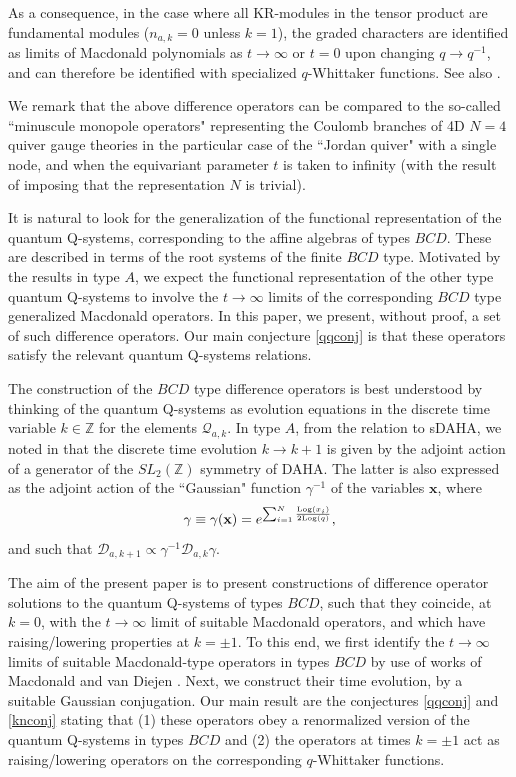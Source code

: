\documentclass[12pt]{amsart}
\newcommand{\Z}{{\mathbb Z}}
\newcommand{\Q}{{\mathcal Q}}
\newcommand{\bx}{{\mathbf x}}
\numberwithin{equation}{section}
\numberwithin{table}{section}
\begin{document}
As a consequence, in the case where all KR-modules in the tensor product are fundamental modules
($n_{a,k}=0$ unless $k=1$), the graded characters are identified as limits of Macdonald polynomials as $t\to\infty$ or $t=0$ upon changing $q\to q^{-1}$, and can therefore be identified with specialized $q$-Whittaker functions. See also \cite{LNSSS}.


We remark that the above difference operators can be compared to the so-called ``minuscule monopole operators" representing
the Coulomb branches of 4D $N=4$ quiver gauge theories \cite{BFN} in the particular case of the ``Jordan quiver" with a single node, and when the equivariant parameter $t$ is taken to infinity (with the result of imposing that the representation $N$ is trivial).



It is natural to look for the generalization of the functional representation  of the   quantum Q-systems,  corresponding to the affine algebras of types $BCD$. These are described in terms of the root systems of the finite $BCD$ type.
 Motivated by the results in type $A$,
we expect the functional representation of the other type quantum Q-systems to involve
the  $t\to\infty$ limits of the corresponding $BCD$ type generalized Macdonald operators. 
In this paper, we present, without proof, a set of such difference operators. Our main conjecture  \ref{qqconj} is that these operators satisfy the relevant quantum Q-systems relations. 


The construction of the $BCD$ type difference operators is best understood by thinking of the
quantum Q-systems as evolution equations in the discrete time variable $k\in \Z$ for the elements 
$\Q_{a,k}$. In type $A$, from the relation to sDAHA, we noted in \cite{DFKqt} that 
the  discrete time evolution $k\to k+1$ is  given by the adjoint action of a generator of the $SL_2(\Z)$ symmetry of  DAHA. The latter is also expressed as the adjoint action of the ``Gaussian" function 
$\gamma^{-1}$ of the variables $\bx$, where
\begin{equation}\label{gaussian}
\gamma\equiv\gamma(\bx)=e^{\sum_{i=1}^N \frac{{\rm Log}(x_i)}{2{\rm Log}(q)}} ,
\end{equation}
and such that ${\mathcal D}_{a,k+1} \propto \gamma^{-1} {\mathcal D}_{a,k} \gamma$.


The aim of the present paper is to present constructions of difference operator solutions to the
quantum Q-systems of types $BCD$, such that they coincide, at $k=0$, with the $t\to\infty$ limit of suitable Macdonald operators, 
and which have raising/lowering properties at $k=\pm 1$. To this end, we first identify the  
$t\to\infty$ limits
of suitable Macdonald-type operators in types $BCD$ by use of works of Macdonald and van Diejen \cite{macdoroot,vandiej,vandiejtwo}. 
Next, we construct their time evolution, by a suitable Gaussian conjugation. Our main result are the conjectures \ref{qqconj} and \ref{knconj} stating that (1) these
operators obey a renormalized version of the quantum Q-systems in types $BCD$ and (2) the operators at times $k=\pm 1$ act as raising/lowering operators on the corresponding $q$-Whittaker functions.
\end{document}

